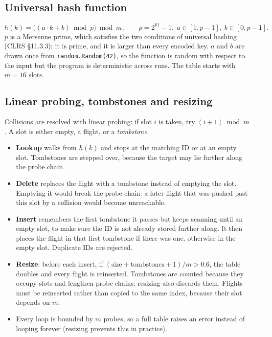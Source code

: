 \documentclass[11pt]{article}
\begin{document}
\subsection{Universal hash function}
\[
h(k) = \bigl((a\cdot k + b) \bmod p\bigr) \bmod m,
\qquad p = 2^{61}-1,\; a \in [1,p-1],\; b\in[0,p-1].
\]
$p$ is a Mersenne prime, which satisfies the two conditions of universal hashing
(CLRS \S11.3.3): it is prime, and it is larger than every encoded key.
$a$ and $b$ are drawn once from \texttt{random.Random(42)}, so the function is
random with respect to the input but the program is deterministic across runs.
The table starts with $m = 16$ slots.

\subsection{Linear probing, tombstones and resizing}
Collisions are resolved with linear probing: if slot $i$ is taken, try
$(i+1) \bmod m$. A slot is either empty, a flight, or a \emph{tombstone}.

\begin{itemize}
  \item \textbf{Lookup} walks from $h(k)$ and stops at the matching ID or at an
  empty slot. Tombstones are stepped over, because the target may lie further
  along the probe chain.
  \item \textbf{Delete} replaces the flight with a tombstone instead of emptying
  the slot. Emptying it would break the probe chain: a later flight that was
  pushed past this slot by a collision would become unreachable.
  \item \textbf{Insert} remembers the first tombstone it passes but keeps
  scanning until an empty slot, to make sure the ID is not already stored
  further along. It then places the flight in that first tombstone if there
  was one, otherwise in the empty slot. Duplicate IDs are rejected.
  \item \textbf{Resize}: before each insert, if
  $(\text{size}+\text{tombstones}+1)/m > 0.6$, the table doubles and every
  flight is reinserted. Tombstones are counted because they occupy slots and
  lengthen probe chains; resizing also discards them. Flights must be
  reinserted rather than copied to the same index, because their slot depends
  on $m$.
  \item Every loop is bounded by $m$ probes, so a full table raises an error
  instead of looping forever (resizing prevents this in practice).
\end{itemize}
\end{document}
